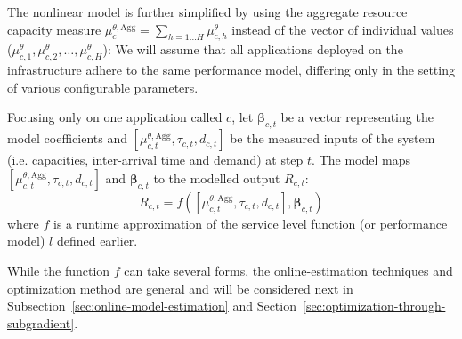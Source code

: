  The nonlinear model is further simplified by using the aggregate resource capacity measure $ \mu^{\theta,\text{Agg}}_c = \sum_{h=1...H}{\mu^\theta_{c,h}}$ instead of the vector of individual values
($\mu^\theta_{c,1},\mu^\theta_{c,2},\dots ,\mu^\theta_{c,H}$):%
  We will assume that all applications deployed on the infrastructure adhere to the same performance model, differing only in the setting
  of various configurable parameters. 
	
	Focusing only on one application called $c$, let $\boldsymbol\beta_{c,t}$ be a vector representing the model coefficients
 and $\left[\mu^{\theta,\text{Agg}}_{c,t},\tau_{c,t},d_{c,t}\right]$ be the measured inputs of the system (i.e. capacities, inter-arrival time and demand) 
at step $t$.  
The model maps $\left[\mu^{\theta,\text{Agg}}_{c,t},\tau_{c,t},d_{c,t}\right]$ and $\boldsymbol\beta_{c,t}$ to the modelled output $R_{c,t}$:
\begin{equation}\label{eq:kalman-model} 
R_{c,t}=f(\left[\mu^{\theta,\text{Agg}}_{c,t},\tau_{c,t},d_{c,t}\right],\boldsymbol\beta_{c,t})
\end{equation}
where $f$ is a runtime approximation of the service level function (or performance model) $l$ defined earlier.

While the function $f$ can take several forms, the online-estimation techniques and optimization method are general and will be considered next in Subsection~\ref{sec:online-model-estimation} and Section~\ref{sec:optimization-through-subgradient}.


